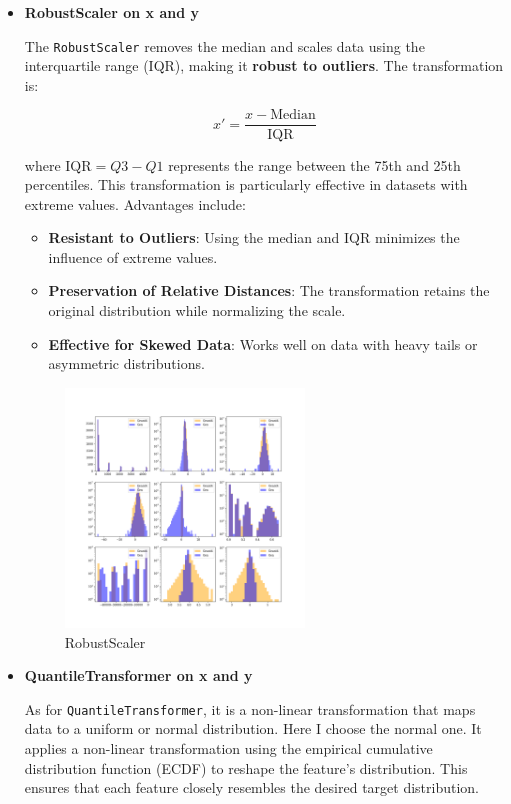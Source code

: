 \noindent
\begin{itemize}
    \item \textbf{RobustScaler on x and y} 
    
    The \texttt{RobustScaler} removes the median and scales data using the interquartile range (IQR), making it \textbf{robust to outliers}. The transformation is:

    \[
    x' = \frac{x - \text{Median}}{\text{IQR}}
    \]
    
    where \( \text{IQR} = Q3 - Q1 \) represents the range between the 75th and 25th percentiles. This transformation is particularly effective in datasets with extreme values. Advantages include:

    \begin{itemize}
        \item \textbf{Resistant to Outliers}: Using the median and IQR minimizes the influence of extreme values.
        \item \textbf{Preservation of Relative Distances}: The transformation retains the original distribution while normalizing the scale.
        \item \textbf{Effective for Skewed Data}: Works well on data with heavy tails or asymmetric distributions.
    \end{itemize}

    \begin{figure}[h!]
        \centering
        \includegraphics[width=0.6\textwidth]{Figures/robustscalar.png} 
        \caption{RobustScaler}\label{fig:robustscalar}
    \end{figure}

    \item \textbf{QuantileTransformer on x and y}

    As for \texttt{QuantileTransformer}, it is a non-linear transformation that maps data to a uniform or normal distribution. Here I choose the normal one.  It applies a non-linear transformation using the empirical cumulative distribution function (ECDF) to reshape the feature's distribution. This ensures that each feature closely resembles the desired target distribution.


\end{itemize}
